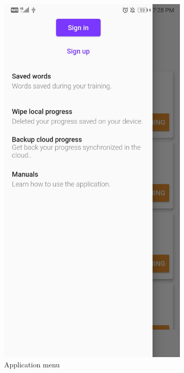\begin{appendices}
\begin{landscape}
\begin{figure}[h]
  \begin{subfigure}{.25\textwidth}
    \centering
    \includegraphics[width=.75\linewidth]{content/imgs/screen9.jpg}
    \caption{Application menu}
  \end{subfigure}%
  \begin{subfigure}{.25\textwidth}
    \centering

\end{subfigure}
\end{figure}
\end{landscape}
\end{appendices}
